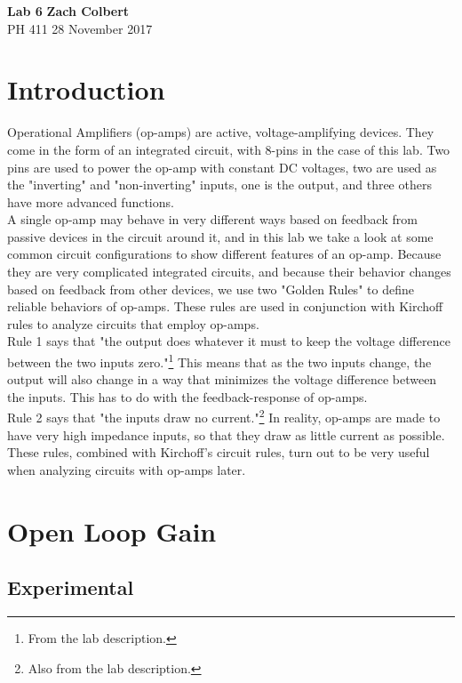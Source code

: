 \documentclass[11pt]{article}
\begin{document}
\noindent
\large\textbf{Lab 6} \hfill \textbf{Zach Colbert} \\
\normalsize PH 411 \hfill 28 November 2017\\

\section{Introduction}
Operational Amplifiers (op-amps) are active, voltage-amplifying devices. They come in the form of an integrated circuit, with 8-pins in the case of this lab. Two pins are used to power the op-amp with constant DC voltages, two are used as the "inverting" and "non-inverting" inputs, one is the output, and three others have more advanced functions.\\

A single op-amp may behave in very different ways based on feedback from passive devices in the circuit around it, and in this lab we take a look at some common circuit configurations to show different features of an op-amp. Because they are very complicated integrated circuits, and because their behavior changes based on feedback from other devices, we use two "Golden Rules" to define reliable behaviors of op-amps. These rules are used in conjunction with Kirchoff rules to analyze circuits that employ op-amps.\\

Rule 1 says that "the output does whatever it must to keep the voltage difference between the two inputs zero."\footnote{From the lab description.} This means that as the two inputs change, the output will also change in a way that minimizes the voltage difference between the inputs. This has to do with the feedback-response of op-amps.\\

Rule 2 says that "the inputs draw no current."\footnote{Also from the lab description.} In reality, op-amps are made to have very high impedance inputs, so that they draw as little current as possible. These rules, combined with Kirchoff's circuit rules, turn out to be very useful when analyzing circuits with op-amps later.\\


\section{Open Loop Gain}
\subsection{Experimental}
\end{document}
